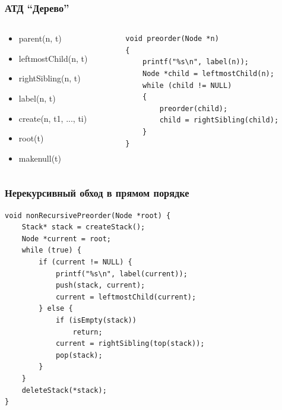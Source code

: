 \documentclass{../../slides-style}
\begin{document}
    \begin{frame}[fragile]
        \frametitle{АТД ``Дерево''}
        \begin{columns}
            \begin{column}{0.6\textwidth}
                \begin{itemize}
                    \item parent(n, t)
                    \item leftmostChild(n, t)
                    \item rightSibling(n, t)
                    \item label(n, t)
                    \item create(n, t1, ..., ti)
                    \item root(t)
                    \item makenull(t)
                \end{itemize}
            \end{column}
            \begin{column}{0.4\textwidth}
                \begin{footnotesize}
                    \begin{verbatim}
void preorder(Node *n)
{
    printf("%s\n", label(n));
    Node *child = leftmostChild(n);
    while (child != NULL)
    {
        preorder(child);
        child = rightSibling(child);
    }
}
                    \end{verbatim}
                \end{footnotesize}
            \end{column}
        \end{columns}
    \end{frame}

    \begin{frame}[fragile]
        \frametitle{Нерекурсивный обход в прямом порядке}
        \begin{footnotesize}
            \begin{verbatim}
void nonRecursivePreorder(Node *root) {
    Stack* stack = createStack();
    Node *current = root;
    while (true) {
        if (current != NULL) {
            printf("%s\n", label(current));
            push(stack, current);
            current = leftmostChild(current);
        } else {
            if (isEmpty(stack))
                return;
            current = rightSibling(top(stack));
            pop(stack);
        }
    }
    deleteStack(*stack);
}
            \end{verbatim}
        \end{footnotesize}
    \end{frame}
\end{document}
